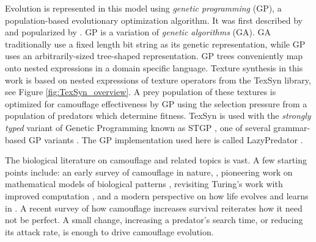 \documentclass[letterpaper]{article}
\newcommand{\jargon}[1]{\textit{#1}}
\newcommand{\texsyn}[0]{TexSyn}
\newcommand{\lazypredator}[0]{LazyPredator}
\begin{document}
\par
Evolution is represented in this model using \jargon{genetic programming} (GP), a population-based evolutionary optimization algorithm. It was first described by \citet{cramer_representation_1985} and popularized by \citet{koza_genetic_1992}. GP is a variation of \jargon{genetic algorithms} (GA). GA traditionally use a fixed length bit string as its genetic representation, while GP uses an arbitrarily-sized tree-shaped representation. GP trees conveniently map onto nested expressions in a domain specific language. Texture synthesis in this work is based on nested expressions of texture operators from the \texsyn{} library, see Figure \ref{fig:TexSyn_overview}. A prey population of these textures is optimized for camouflage effectiveness by GP using the selection pressure from a population of predators which determine fitness. \texsyn{} is used with the \jargon{strongly typed} variant of Genetic Programming known as STGP \cite{montana_strongly_1995}, one of several grammar-based GP variants \cite{Mckay_2010}. The GP implementation used here is called \lazypredator{} \cite{reynolds_lazypredator_2020}.
\par
The biological literature on camouflage and related topics is vast. A few starting points include: an early survey of camouflage in nature, \citet{thayer_concealing-coloration_1909}, pioneering work on mathematical models of biological patterns \citet{turing_chemical_1952}, revisiting Turing's work with improved computation \citet{murray_how_1988}, and a modern perspective on how life evolves and learns in \citet{valiant_probably_2013}. A recent survey of how camouflage increases survival \cite{de_alcantara_viana_predator_2022} reiterates how it need not be perfect. A small change, increasing a predator's search time, or reducing its attack rate, is enough to drive camouflage evolution.
\par


\end{document}
